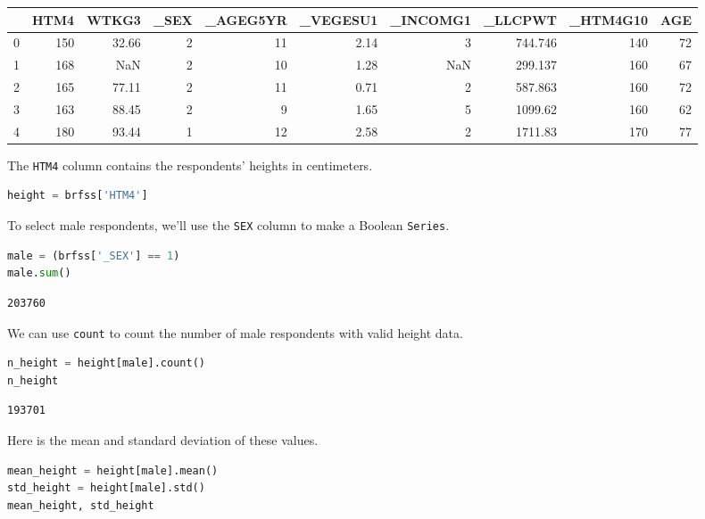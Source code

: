 \begin{tabular}{lrrrrrrrrr}
\toprule
 & HTM4 & WTKG3 & \_SEX & \_AGEG5YR & \_VEGESU1 & \_INCOMG1 & \_LLCPWT & \_HTM4G10 & AGE \\
\midrule
0 & 150 & 32.66 & 2 & 11 & 2.14 & 3 & 744.746 & 140 & 72 \\
1 & 168 & NaN & 2 & 10 & 1.28 & NaN & 299.137 & 160 & 67 \\
2 & 165 & 77.11 & 2 & 11 & 0.71 & 2 & 587.863 & 160 & 72 \\
3 & 163 & 88.45 & 2 & 9 & 1.65 & 5 & 1099.62 & 160 & 62 \\
4 & 180 & 93.44 & 1 & 12 & 2.58 & 2 & 1711.83 & 170 & 77 \\
\bottomrule
\end{tabular}

The \passthrough{\lstinline!HTM4!} column contains the respondents'
heights in centimeters.

\begin{lstlisting}[language=Python,style=source]
height = brfss['HTM4']
\end{lstlisting}

To select male respondents, we'll use the \passthrough{\lstinline!SEX!}
column to make a Boolean \passthrough{\lstinline!Series!}.

\begin{lstlisting}[language=Python,style=source]
male = (brfss['_SEX'] == 1)
male.sum()
\end{lstlisting}

\begin{lstlisting}[style=output]
203760
\end{lstlisting}

We can use \passthrough{\lstinline!count!} to count the number of male respondents
with valid height data.

\begin{lstlisting}[language=Python,style=source]
n_height = height[male].count()
n_height
\end{lstlisting}

\begin{lstlisting}[style=output]
193701
\end{lstlisting}

\pagebreak

Here is the mean and standard deviation of these values.

\begin{lstlisting}[language=Python,style=source]
mean_height = height[male].mean()
std_height = height[male].std()
mean_height, std_height
\end{lstlisting}

